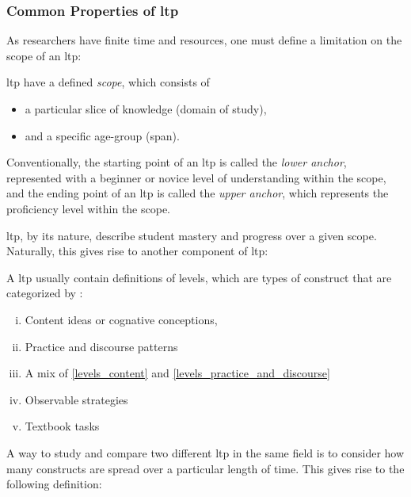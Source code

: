 \documentclass{TC}
\begin{document}
\subsubsection{Common Properties of \gls{ltp}}

As researchers have finite time and resources, one must define a limitation on the scope of an \gls{ltp}:

\begin{mdframed}
\begin{definition}
\gls{ltp} have a defined \emph{scope}, which consists of
\begin{itemize}
\item a particular slice of knowledge (domain of study), \item and a specific age-group (span).
\end{itemize}
Conventionally, the starting point of an \gls{ltp} is called the \emph{lower anchor}, represented with a beginner or novice level of understanding within the scope, and the ending point of an \gls{ltp} is called the \emph{upper anchor}, which represents the proficiency level within the scope.
\end{definition}
\end{mdframed}
\gls{ltp}, by its nature, describe student mastery and progress over a given scope. Naturally, this gives rise to another component of \gls{ltp}:
\begin{mdframed}
\begin{definition}
A \gls{ltp} usually contain definitions of levels, which are types of construct that are categorized by \parencite{duncan_learning_2018} \parencite{lobato_taxonomy_2017}:
\begin{enumerate}[(i)]
\item Content ideas or cognative conceptions, \label{levels_content}
\item Practice and discourse patterns \label{levels_practice_and_discourse}
\item A mix of \ref{levels_content} and \ref{levels_practice_and_discourse} 
\item Observable strategies
\item Textbook tasks
\end{enumerate}
\end{definition}
\end{mdframed}

A way to study and compare two different \gls{ltp} in the same field is to consider how many constructs are spread over a particular length of time. This gives rise to the following definition:
\end{document}
